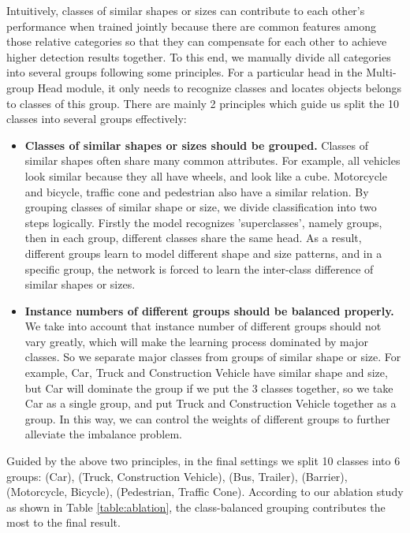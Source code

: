 \documentclass[10pt,twocolumn,letterpaper]{article}
\begin{document}
Intuitively, classes of similar shapes or sizes can contribute to each other's performance when trained jointly because there are common features among those relative categories so that they can compensate for each other to achieve higher detection results together. To this end, we manually divide all categories into several groups following some principles. For a particular head in the Multi-group Head module, it only needs to recognize classes and locates objects belongs to classes of this group. There are mainly 2 principles which guide us split the 10 classes into several groups effectively:
\begin{itemize}
    \item \textbf{Classes of similar shapes or sizes should be grouped.} Classes of similar shapes often share many common attributes. For example, all vehicles look similar because they all have wheels, and look like a cube. Motorcycle and bicycle,  traffic cone and pedestrian also have a similar relation. By grouping classes of similar shape or size, we divide classification into two steps logically. Firstly the model recognizes 'superclasses', namely groups, then in each group, different classes share the same head. As a result, different groups learn to model different shape and size patterns, and in a specific group, the network is forced to learn the inter-class difference of similar shapes or sizes.
    \item \textbf{Instance numbers of different groups should be balanced properly.} We take into account that instance number of different groups should not vary greatly, which will make the learning process dominated by major classes. So we separate major classes from groups of similar shape or size. For example, Car, Truck and Construction Vehicle have similar shape and size, but Car will dominate the group if we put the 3 classes together, so we take Car as a single group, and put Truck and Construction Vehicle together as a group. In this way, we can control the weights of different groups to further alleviate the imbalance problem.
\end{itemize} 

Guided by the above two principles, in the final settings we split 10 classes into 6 groups: (Car), (Truck, Construction Vehicle), (Bus, Trailer), (Barrier), (Motorcycle, Bicycle), (Pedestrian, Traffic Cone). According to our ablation study as shown in Table \ref{table:ablation}, the class-balanced grouping contributes the most to the final result.
\end{document}
